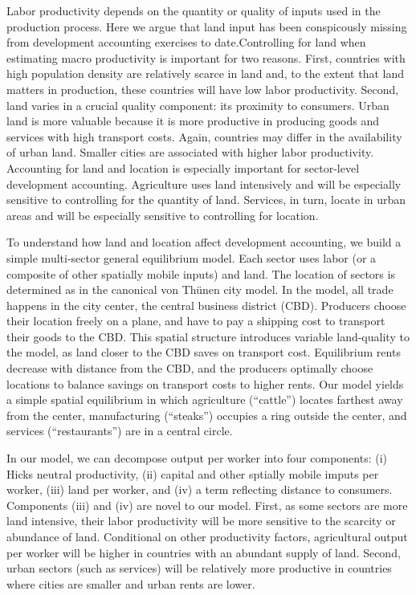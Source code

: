 \documentclass[12pt]{article}
\begin{document}
Labor productivity depends on the quantity or quality of inputs used in the production process. Here we argue that land input has been conspicously missing from development accounting exercises to date.Controlling for land when estimating macro productivity is important for two reasons. First, countries with high population density are relatively scarce in land and, to the extent that land matters in production, these countries will have low labor productivity. Second, land varies in a crucial quality component: its proximity to consumers. Urban land is more valuable because it is more productive in producing goods and services with high transport costs. Again, countries may differ in the availability of urban land. Smaller cities are associated with higher labor productivity. Accounting for land and location is especially important for sector-level development accounting. Agriculture uses land intensively and will be especially sensitive to controlling for the quantity of land. Services, in turn, locate in urban areas and will be especially sensitive to controlling for location. 

To understand how land and location affect development accounting, we build a simple multi-sector general equilibrium model. Each sector uses labor (or a composite of other spatially mobile inputs) and land. The location of sectors is determined as in the canonical von Thünen city model. In the model, all trade happens in the city center, the central business district (CBD). Producers choose their location freely on a plane, and have to pay a shipping cost to transport their goods to the CBD. This spatial structure introduces variable land-quality to the model, as land closer to the CBD saves on transport cost. Equilibrium rents decrease with distance from the CBD, and the producers optimally choose locations to balance savings on transport costs to higher rents. Our model yields a simple spatial equilibrium in which agriculture (``cattle'') locates farthest away from the center, manufacturing (``steaks'') occupies a ring outside the center, and services (``restaurants'') are in a central circle.

In our model, we can decompose output per worker into four components: (i) Hicks neutral productivity, (ii) capital and other sptially mobile imputs per worker, (iii) land per worker, and (iv) a term reflecting distance to consumers. Components (iii) and (iv) are novel to our model. First, as some sectors are more land intensive, their labor productivity will be more sensitive to the scarcity or abundance of land. Conditional on other productivity factors, agricultural output per worker will be higher in countries with an abundant supply of land. Second, urban sectors (such as services) will be relatively more productive in countries where cities are smaller and urban rents are lower.
\end{document}
